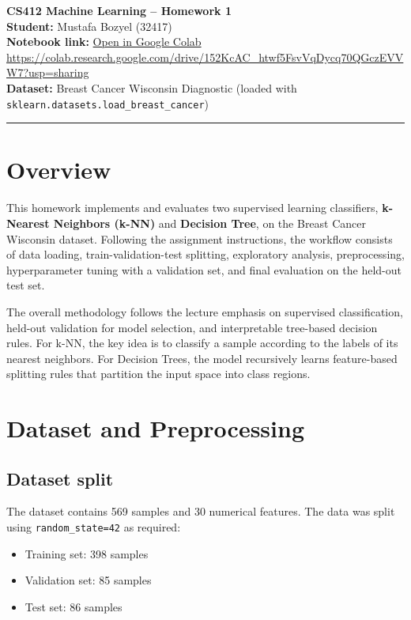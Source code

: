 \documentclass[11pt,a4paper]{article}
\begin{document}
{\Large \textbf{CS412 Machine Learning -- Homework 1}}\\[0.4em]
\textbf{Student:} Mustafa Bozyel (32417)\\
\textbf{Notebook link:} \href{https://colab.research.google.com/drive/152KcAC_htwf5FsvVqDycq70QGczEVVW7?usp=sharing}{Open in Google Colab}\\
{\footnotesize \url{https://colab.research.google.com/drive/152KcAC_htwf5FsvVqDycq70QGczEVVW7?usp=sharing}}\\
\textbf{Dataset:} Breast Cancer Wisconsin Diagnostic (loaded with \texttt{sklearn.datasets.load\_breast\_cancer})

\vspace{0.8em}
\hrule
\vspace{0.8em}

\section{Overview}
This homework implements and evaluates two supervised learning classifiers, \textbf{k-Nearest Neighbors (k-NN)} and \textbf{Decision Tree}, on the Breast Cancer Wisconsin dataset. Following the assignment instructions, the workflow consists of data loading, train-validation-test splitting, exploratory analysis, preprocessing, hyperparameter tuning with a validation set, and final evaluation on the held-out test set.

The overall methodology follows the lecture emphasis on supervised classification, held-out validation for model selection, and interpretable tree-based decision rules. For k-NN, the key idea is to classify a sample according to the labels of its nearest neighbors. For Decision Trees, the model recursively learns feature-based splitting rules that partition the input space into class regions.

\section{Dataset and Preprocessing}
\subsection{Dataset split}
The dataset contains 569 samples and 30 numerical features. The data was split using \texttt{random\_state=42} as required:
\begin{itemize}
    \item Training set: 398 samples
    \item Validation set: 85 samples
    \item Test set: 86 samples
\end{itemize}
\end{document}
